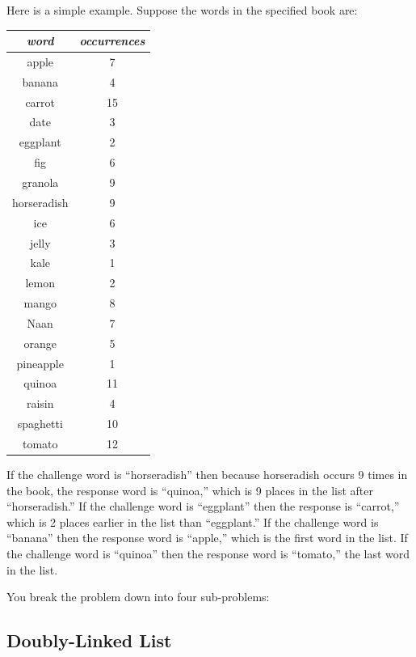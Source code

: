 Here is a simple example. Suppose the words in the specified book are:

\begin{center}
\begin{tabular}{cc}
\textit{word} & \textit{occurrences} \\ \hline
apple       & 7 \\
banana      & 4 \\
carrot      & 15 \\
date        & 3 \\
eggplant    & 2 \\
fig         & 6 \\
granola     & 9 \\
horseradish & 9 \\
ice         & 6 \\
jelly       & 3 \\
kale        & 1 \\
lemon       & 2 \\
mango       & 8 \\
Naan        & 7 \\
orange      & 5 \\
pineapple   & 1 \\
quinoa      & 11 \\
raisin      & 4 \\
spaghetti   & 10 \\
tomato      & 12 \\
\end{tabular}
\end{center}
If the challenge word is ``horseradish'' then because horseradish occurs 9
times in the book, the response word is ``quinoa,'' which is 9 places in the
list after ``horseradish.'' If the challenge word is ``eggplant'' then the
response is ``carrot,'' which is 2 places earlier in the list than
``eggplant.'' If the challenge word is ``banana'' then the response word is
``apple,'' which is the first word in the list. If the challenge word is
``quinoa'' then the response word is ``tomato,'' the last word in the list.

You break the problem down into four sub-problems:

\subsection{Doubly-Linked List}

